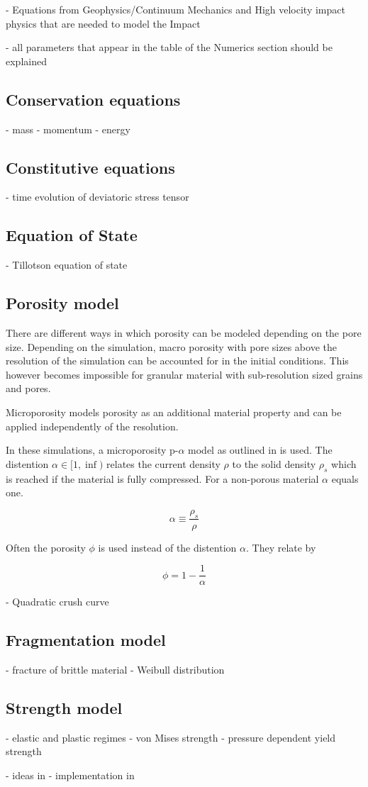 - Equations from Geophysics/Continuum Mechanics and High velocity impact physics that are needed to model the Impact

- all parameters that appear in the table of the Numerics section should be explained

\subsection{Conservation equations}
- mass
- momentum
- energy

\subsection{Constitutive equations}
- time evolution of deviatoric stress tensor


\subsection{Equation of State}
- Tillotson equation of state \cite{Tillotson_1962}

\subsection{Porosity model}
There are different ways in which porosity can be modeled depending on the pore size. Depending on the simulation, macro porosity with pore sizes above the resolution of the simulation can be accounted for in the initial conditions. This however becomes impossible for granular material with sub-resolution sized grains and pores.

Microporosity models porosity as an additional material property and can be applied independently of the resolution.


In these simulations, a microporosity p-$\alpha$ model as outlined in \cite{Jutzi_2008} is used. The distention $\alpha \in [1,\inf)$ relates the current density $\rho$ to the solid density $\rho_s$ which is reached if the material is fully compressed. For a non-porous material $\alpha$ equals one.

\begin{equation}
    \alpha \equiv \frac{\rho_s}{\rho}
\end{equation}

Often the porosity $\phi$ is used instead of the distention $\alpha$. They relate by

\begin{equation}
    \phi = 1 - \frac{1}{\alpha}
\end{equation}

- Quadratic crush curve

\subsection{Fragmentation model}
- fracture of brittle material
- Weibull distribution

\subsection{Strength model}
- elastic and plastic regimes
- von Mises strength
- pressure dependent yield strength

- ideas in \cite{Collins_2004}
- implementation in \cite{Jutzi_2015}